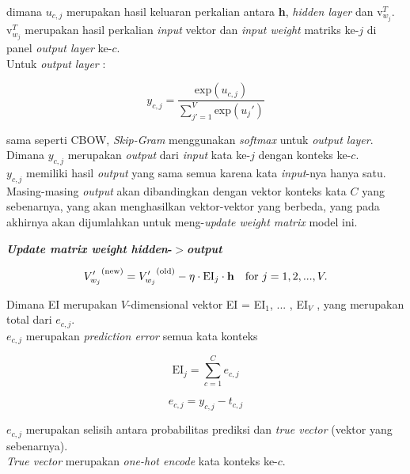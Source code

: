 \documentclass[12pt]{report}
\begin{document}
\begin{enumerate}
dimana $u_{c,j}$ merupakan hasil keluaran perkalian antara \textbf{h}, \textit{hidden layer} dan $\text{v}_{w_j}^T$.\\
$\text{v}_{w_j}^T$ merupakan hasil perkalian \textit{input} vektor dan \textit{input weight} matriks ke-$j$ di panel \textit{output layer} ke-$c$. \\Untuk \textit{output layer} :

\begin{equation}
y_{c,j} = \frac{\text{exp}(u_{c,j})}{\sum_{j'=1}^V \text{exp}(u_j')} \label{eq11}
\end{equation}

sama seperti CBOW, \textit{Skip-Gram} menggunakan \textit{softmax} untuk \textit{output layer}. \\Dimana $y_{c,j}$ merupakan \textit{output} dari \textit{input} kata ke-$j$ dengan konteks ke-$c$.\\ $y_{c,j}$ memiliki hasil \textit{output} yang sama semua karena kata \textit{input}-nya hanya satu. Masing-masing \textit{output} akan dibandingkan dengan vektor konteks kata $C$ yang sebenarnya, yang akan menghasilkan vektor-vektor yang berbeda, yang pada akhirnya akan dijumlahkan untuk meng-\textit{update weight matrix} model ini.
\newline
\newline


\textbf{\textit{Update matrix weight hidden}-$>$\textit{output}}

\begin{align}
{V'_{w_j}}^{\text{(new)}} = {V'_{w_j}}^{\text{(old)}} - \eta \cdot \text{EI}_j \cdot \text{\textbf{h}} && \text{for $j$} = 1, 2, ..., V. \label{eq12}
\end{align}

Dimana EI merupakan $V$-dimensional vektor EI = {EI$_1$, ... , EI$_V$ }, yang merupakan total dari $e_{c,j}$. \\$e_{c,j}$ merupakan \textit{prediction error} semua kata konteks

\begin{equation}
\text{EI}_j=\sum_{c=1}^C e_{c,j} \label{eq13}
\end{equation}

\begin{equation}
e_{c,j}= y_{c,j}-t_{c,j} \label{eq14}
\end{equation}

$e_{c,j}$ merupakan selisih antara probabilitas prediksi dan \textit{true vector} (vektor yang sebenarnya).
\\ \textit{True vector} merupakan \textit{one-hot encode} kata konteks ke-$c$.
\newline
\newline



\end{enumerate}
\end{document}
